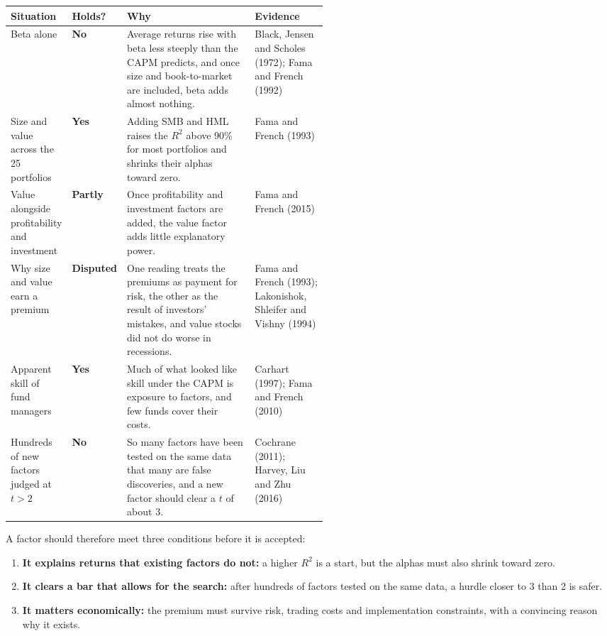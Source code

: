 \begin{center}
\small
\begin{tabularx}{\linewidth}{@{}>{\raggedright\arraybackslash}p{0.19\linewidth}>{\raggedright\arraybackslash}p{0.10\linewidth}>{\raggedright\arraybackslash}X>{\raggedright\arraybackslash}p{0.23\linewidth}@{}}
\toprule
Situation & Holds? & Why & Evidence \\
\midrule
Beta alone & \textbf{No} & Average returns rise with beta less steeply than the CAPM predicts, and once size and book-to-market are included, beta adds almost nothing. & Black, Jensen and Scholes (1972); Fama and French (1992) \\
\addlinespace[3pt]
Size and value across the 25 portfolios & \textbf{Yes} & Adding SMB and HML raises the $R^2$ above 90\% for most portfolios and shrinks their alphas toward zero. & Fama and French (1993) \\
\addlinespace[3pt]
Value alongside profitability and investment & \textbf{Partly} & Once profitability and investment factors are added, the value factor adds little explanatory power. & Fama and French (2015) \\
\addlinespace[3pt]
Why size and value earn a premium & \textbf{Disputed} & One reading treats the premiums as payment for risk, the other as the result of investors' mistakes, and value stocks did not do worse in recessions. & Fama and French (1993); Lakonishok, Shleifer and Vishny (1994) \\
\addlinespace[3pt]
Apparent skill of fund managers & \textbf{Yes} & Much of what looked like skill under the CAPM is exposure to factors, and few funds cover their costs. & Carhart (1997); Fama and French (2010) \\
\addlinespace[3pt]
Hundreds of new factors judged at $t > 2$ & \textbf{No} & So many factors have been tested on the same data that many are false discoveries, and a new factor should clear a $t$ of about 3. & Cochrane (2011); Harvey, Liu and Zhu (2016) \\
\bottomrule
\end{tabularx}
\end{center}

A factor should therefore meet three conditions before it is accepted:

\begin{enumerate}
  \item \textbf{It explains returns that existing factors do not:} a higher $R^2$ is a start, but the alphas must also shrink toward zero.
  \item \textbf{It clears a bar that allows for the search:} after hundreds of factors tested on the same data, a hurdle closer to 3 than 2 is safer.
  \item \textbf{It matters economically:} the premium must survive risk, trading costs and implementation constraints, with a convincing reason why it exists.
\end{enumerate}

